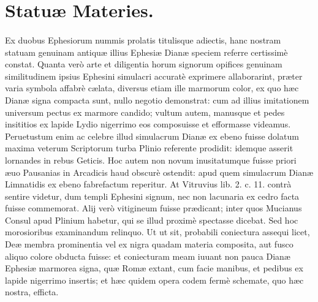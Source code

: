 \documentclass[a4paper, 11pt, oneside, polutonikogreek, latin]{article}
\begin{document}
\section{Statuæ Materies.}
\paragraph{}
Ex duobus Ephesiorum nummis prolatis titulisque adiectis, hanc nostram statuam genuinam antiquæ illius Ephesiæ Dianæ speciem referre certissimè constat. Quanta verò arte et diligentia horum signorum opifices genuinam similitudinem ipsius Ephesini simulacri accuratè exprimere allaborarint, præter varia symbola affabrè cælata, diversus etiam ille marmorum color, ex quo hæc Dianæ signa compacta sunt, nullo negotio demonstrat: cum ad illius imitationem universum pectus ex marmore candido; vultum autem, manusque et pedes insititios ex lapide Lydio nigerrimo eos composuisse et efformasse videamus. Peruetustum enim ac celebre illud simulacrum Dianæ ex ebeno fuisse dolatum maxima veterum Scriptorum turba Plinio referente prodidit: idemque asserit lornandes in rebus Geticis. Hoc autem non novum inusitatumque fuisse priori æuo Pausanias in Arcadicis haud obscurè ostendit: apud quem simulacrum Dianæ Limnatidis ex ebeno fabrefactum reperitur. At Vitruvius lib. 2. c. 11. contrà sentire videtur, dum templi Ephesini signum, nec non lacunaria ex cedro facta fuisse commemorat. Alij verò vitigineum fuisse prædicant; inter quos Mucianus Consul apud Plinium habetur, qui se illud proximè spectasse dicebat. Sed hoc morosioribus examinandum relinquo. Ut ut sit, probabili coniectura assequi licet, Deæ membra prominentia vel ex nigra quadam materia composita, aut fusco aliquo colore obducta fuisse: et coniecturam meam iuuant non pauca Dianæ Ephesiæ marmorea signa, quæ Romæ extant, cum facie manibus, et pedibus ex lapide nigerrimo insertis; et hæc quidem opera codem fermè schemate, quo hæc nostra, efficta.
\end{document}
